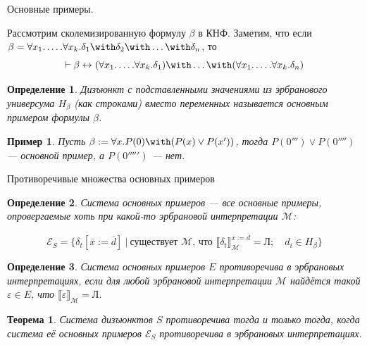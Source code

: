 \documentclass[aspectratio=169]{beamer}
\newtheorem{thm}{Теорема}[section]
\newtheorem{dfn}{Определение}[section]
\newtheorem{exm}{Пример}[section]
\begin{document}
\begin{frame}{Основные примеры.}

Рассмотрим сколемизированную формулу $\beta$ в КНФ. Заметим, что если $\beta = \forall x_1.\dots.\forall x_k.\delta_1\with\delta_2\with\dots\with\delta_n$,
то $$\vdash \beta \leftrightarrow (\forall x_1.\dots.\forall x_k.\delta_1)\with\dots\with(\forall x_1.\dots.\forall x_k.\delta_n)$$

\begin{dfn}
Дизъюнкт с подставленными значениями из эрбранового универсума $H_\beta$ (как строками) вместо переменных называется основным примером формулы $\beta$.
\end{dfn}
\begin{exm}Пусть $\beta := \forall x.P(0) \with (P(x)\vee P(x'))$, тогда $P(0''')\vee P(0'''')$ --- основной пример, а $P(0''''')$ --- нет.
\end{exm}


\end{frame}

\begin{frame}{Противоречивые множества основных примеров}

\begin{dfn}Система основных примеров --- все основные примеры, опровергаемые хоть при какой-то эрбрановой интерпретации $\mathcal{M}$:

\vspace{-0.3cm}
$$\mathcal{E}_S = \{ \delta_t[\overline{x} := \overline{d}]\ |\ \text{существует }\mathcal{M}\text{, что } \llbracket \delta_t \rrbracket^{\overline{x} := \overline{d}}_\mathcal{M}=\text{Л};\quad d_i \in H_\beta\}$$
\end{dfn}

\begin{dfn}Система основных примеров $E$ противоречива в эрбрановых интерпретациях, если 
для любой эрбрановой интерпретации $\mathcal{M}$ найдётся такой $\varepsilon\in E$, 
что $\llbracket \varepsilon \rrbracket_\mathcal{M} = \text{Л}$.
\end{dfn}

\begin{thm}Система дизъюнктов $S$ противоречива тогда и только тогда, когда система её 
основных примеров $\mathcal{E}_S$ противоречива в эрбрановых интерпретациях.\end{thm}
\end{frame}
\end{document}
